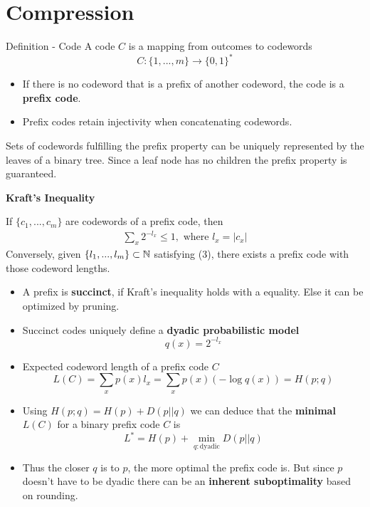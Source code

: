 \section{Compression}

\begin{mainbox}
    {Definition - Code} 
    A code \(C\) is a mapping from outcomes to codewords
    \[C: \{1, ..., m\} \to \{0, 1\}^*\]
    \begin{itemize}[label=-]
        \item If there is no codeword that is a prefix of another codeword, the code is a \textbf{prefix code}. 
        \item Prefix codes retain injectivity when concatenating codewords.
    \end{itemize}
\end{mainbox}
Sets of codewords fulfilling the prefix property can be uniquely represented by the leaves of a binary tree. 
Since a leaf node has no children the prefix property is guaranteed.

\vspace*{1mm}
\textbf{Kraft's Inequality}

    If \(\{c_1, ...,c_m\}\) are codewords of a prefix code, then 
\begin{align}
    \sum_{x}2^{-l_x} \leq 1, \text{ where }l_x = |c_x|
\end{align}
Conversely, given \(\{l_1, ..., l_m\} \subset \mathbb{N}\) satisfying (3), there exists a prefix code with those codeword lengths.
\begin{itemize}[label=-]
    \item A prefix is \textbf{succinct}, if Kraft's inequality holds with a equality. Else it can be optimized by pruning.
    \item Succinct codes uniquely define a \textbf{dyadic probabilistic model}
    \[q(x) = 2^{- l_x}\]
    \item Expected codeword length of a prefix code \(C\) 
    \[L(C) = \sum_{x}p(x) l_x = \sum_{x}p(x) (-\log q(x)) = H(p; q)\]
    \item Using \(H(p; q) = H(p) + D(p || q)\) we can deduce that the \textbf{minimal \(L(C)\)} for a binary prefix code \(C\) is
    \[L^* = H(p) + \min_{q: \text{dyadic}} D(p || q)\]
    \item Thus the closer \(q\) is to \(p\), the more optimal the prefix code is. 
    But since \(p\) doesn't have to be dyadic there can be an \textbf{inherent suboptimality} based on rounding.
\end{itemize}

